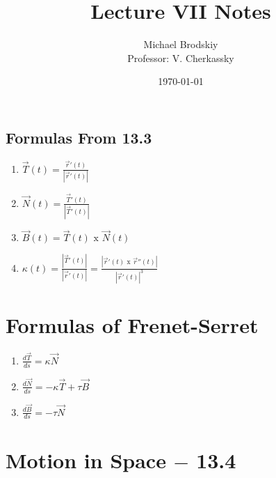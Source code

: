 \documentclass[12pt]{article}
\title{Lecture VII Notes}
\date{\today}
\author{Michael Brodskiy\\ \small Professor: V. Cherkassky}
\begin{document}
\maketitle

\subsection{Formulas From 13.3}

\begin{enumerate}

  \item $\overrightarrow{T}(t)=\frac{\overrightarrow{r}'(t)}{|\overrightarrow{r}'(t)|}$

  \item $\overrightarrow{N}(t)=\frac{\overrightarrow{T}'(t)}{|\overrightarrow{T}'(t)|}$

  \item $\overrightarrow{B}(t)=\overrightarrow{T}(t)\text{ x }\overrightarrow{N}(t)$

  \item $\kappa(t)=\frac{|\overrightarrow{T}'(t)|}{|\overrightarrow{r}'(t)|}=\frac{|\overrightarrow{r}'(t)\text{ x }\overrightarrow{r}''(t)|}{|\overrightarrow{r}'(t)|^3}$

\end{enumerate}

\section{Formulas of Frenet-Serret}

\begin{enumerate}

  \item $\frac{d\overrightarrow{T}}{ds}=\kappa\overrightarrow{N}$

  \item $\frac{d\overrightarrow{N}}{ds}=-\kappa\overrightarrow{T}+\tau\overrightarrow{B}$

  \item $\frac{d\overrightarrow{B}}{ds}=-\tau\overrightarrow{N}$  

\end{enumerate}

\section{Motion in Space $-$ 13.4}
\end{document}
